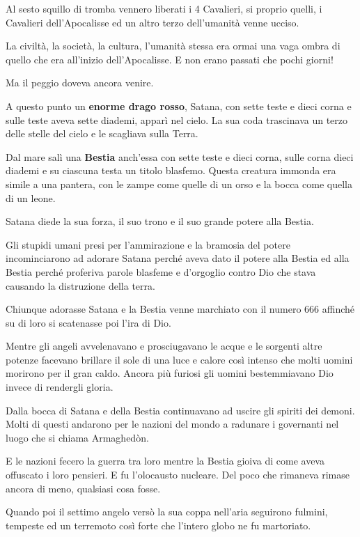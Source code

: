 \documentclass[a4paper,twoside,openany]{book}
\begin{document}
\begin{multicols}{2}
Al sesto squillo di tromba vennero liberati i 4 Cavalieri, si proprio quelli, i Cavalieri dell'Apocalisse ed un altro terzo dell'umanità venne ucciso.

La civiltà, la società, la cultura, l'umanità stessa era ormai una vaga ombra di quello che era all'inizio dell'Apocalisse. E non erano passati che pochi giorni!

Ma il peggio doveva ancora venire.

A questo punto un \textbf{enorme drago rosso}, Satana, con sette teste e dieci corna e sulle teste aveva sette diademi, apparì nel cielo. La sua coda trascinava un terzo delle stelle del cielo e le scagliava sulla Terra.

Dal mare salì una \textbf{Bestia} anch'essa con sette teste e dieci corna, sulle corna dieci diademi e su ciascuna testa un titolo blasfemo. Questa creatura immonda era simile a una pantera, con le zampe come quelle di un orso e la bocca come quella di un leone.

Satana diede la sua forza, il suo trono e il suo grande potere alla Bestia.

Gli stupidi umani presi per l'ammirazione e la bramosia del potere incominciarono ad adorare Satana perché aveva dato il potere alla Bestia ed alla Bestia perché proferiva parole blasfeme e d'orgoglio contro Dio che stava causando la distruzione della terra.

Chiunque adorasse Satana e la Bestia venne marchiato con il numero 666 affinché su di loro si scatenasse poi l'ira di Dio.

Mentre gli angeli avvelenavano e prosciugavano le acque e le sorgenti altre potenze facevano brillare il sole di una luce e calore così intenso che molti uomini morirono per il gran caldo. Ancora più furiosi gli uomini bestemmiavano Dio invece di rendergli gloria.

Dalla bocca di Satana e della Bestia continuavano ad uscire gli spiriti dei demoni. Molti di questi andarono per le nazioni del mondo a radunare i governanti nel luogo che si chiama Armaghedòn.

E le nazioni fecero la guerra tra loro mentre la Bestia gioiva di come aveva offuscato i loro pensieri. E fu l'olocausto nucleare. Del poco che rimaneva rimase ancora di meno, qualsiasi cosa fosse.

Quando poi il settimo angelo versò la sua coppa nell’aria seguirono fulmini, tempeste ed un terremoto così forte che l'intero globo ne fu martoriato.


\end{multicols}
\end{document}
